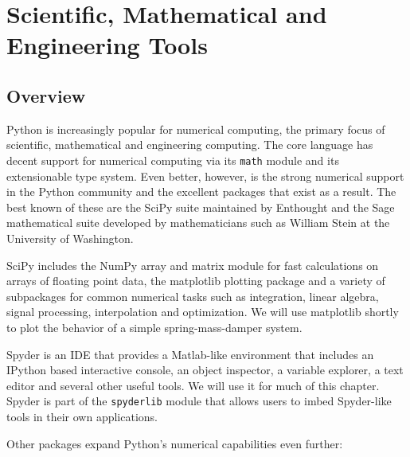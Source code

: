 
\chapter{Scientific, Mathematical and Engineering Tools}
\section{Overview}
Python is increasingly popular for numerical computing, the primary focus of scientific, mathematical and engineering computing. The core language has decent support for numerical computing via its \verb|math| module and its extensionable type system. Even better, however, is the strong numerical support in the Python community and the excellent packages that exist as a result. The best known of these are the SciPy suite maintained by Enthought and the Sage mathematical suite developed by mathematicians such as William Stein at the University of Washington.

SciPy\cite{website:scipy} includes the NumPy array and matrix module for fast calculations on arrays of floating point data, the matplotlib plotting package and a variety of subpackages for common numerical tasks such as integration, linear algebra, signal processing, interpolation and optimization. We will use matplotlib\cite{website:matplotlib} shortly to plot the behavior of a simple spring-mass-damper system.

Spyder is an IDE that provides a Matlab-like environment that includes an IPython based interactive console, an object inspector, a variable explorer, a text editor and several other useful tools. We will use it for much of this chapter. Spyder is part of the \verb|spyderlib| module that allows users to imbed Spyder-like tools in their own applications.

Other packages expand Python's numerical capabilities even further:

